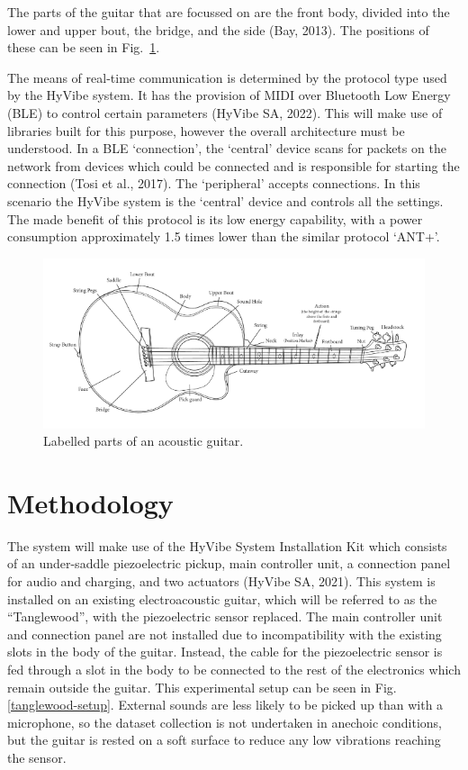 \documentclass[conference]{IEEEtran}
\begin{document}
The parts of the guitar that are focussed on are the front body, divided into the lower and upper bout, the bridge, and the side (Bay, 2013). The positions of these can be seen in Fig.~\ref{guitar}.

The means of real-time communication is determined by the protocol type used by the HyVibe system. It has the provision of MIDI over Bluetooth Low Energy (BLE) to control certain parameters (HyVibe SA, 2022). This will
make use of libraries built for this purpose, however the overall architecture must be understood. In a BLE `connection', the `central' device scans for packets on the network from devices which could be connected and 
is responsible for starting the connection (Tosi et al., 2017). The `peripheral' accepts connections. In this scenario the HyVibe system is the `central' device and controls all the settings. The made benefit of this protocol is
its low energy capability, with a power consumption approximately 1.5 times lower than the similar protocol `ANT+'. 

\begin{figure}[htbp]
    \centerline{\includegraphics[scale=0.4]{guitar.png}}
    \caption{Labelled parts of an acoustic guitar. \cite{b3}}
    \label{guitar}
    \end{figure}

\section{Methodology}
The system will make use of the HyVibe System Installation Kit which consists of an under-saddle piezoelectric pickup, main controller unit, a connection panel for audio and charging, and two actuators (HyVibe SA, 2021).
This system is installed on an existing electroacoustic guitar, which will be referred to as the ``Tanglewood'', with the piezoelectric sensor replaced. The main controller unit and connection panel are not installed due to incompatibility with the existing slots in
the body of the guitar. Instead, the cable for the piezoelectric sensor is fed through a slot in the body to be connected to the rest of the electronics which remain outside the guitar. This experimental setup can be
seen in Fig. \ref{tanglewood-setup}. External sounds are less likely to be picked up than with a microphone, so the dataset collection is not undertaken in anechoic conditions, but the guitar is rested on a soft surface to reduce any low
vibrations reaching the sensor.
\end{document}
